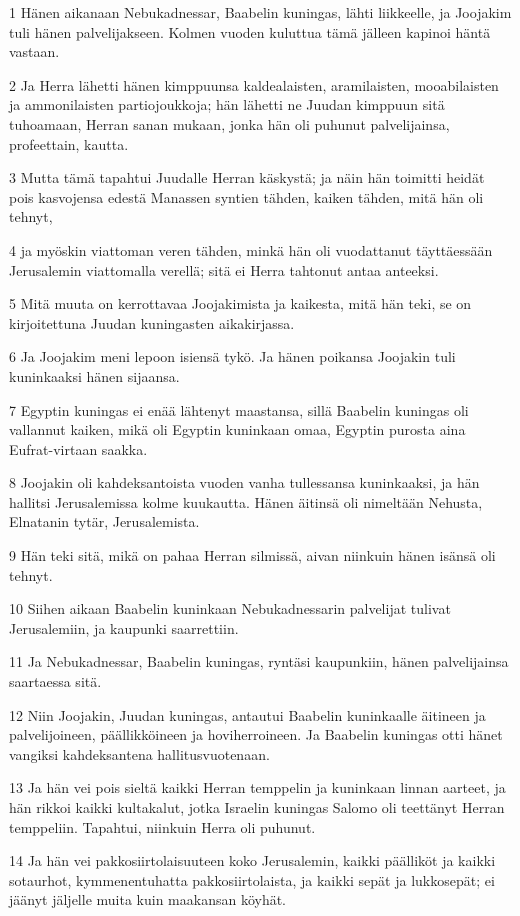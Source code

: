 \par 1 Hänen aikanaan Nebukadnessar, Baabelin kuningas, lähti liikkeelle, ja Joojakim tuli hänen palvelijakseen. Kolmen vuoden kuluttua tämä jälleen kapinoi häntä vastaan.
\par 2 Ja Herra lähetti hänen kimppuunsa kaldealaisten, aramilaisten, mooabilaisten ja ammonilaisten partiojoukkoja; hän lähetti ne Juudan kimppuun sitä tuhoamaan, Herran sanan mukaan, jonka hän oli puhunut palvelijainsa, profeettain, kautta.
\par 3 Mutta tämä tapahtui Juudalle Herran käskystä; ja näin hän toimitti heidät pois kasvojensa edestä Manassen syntien tähden, kaiken tähden, mitä hän oli tehnyt,
\par 4 ja myöskin viattoman veren tähden, minkä hän oli vuodattanut täyttäessään Jerusalemin viattomalla verellä; sitä ei Herra tahtonut antaa anteeksi.
\par 5 Mitä muuta on kerrottavaa Joojakimista ja kaikesta, mitä hän teki, se on kirjoitettuna Juudan kuningasten aikakirjassa.
\par 6 Ja Joojakim meni lepoon isiensä tykö. Ja hänen poikansa Joojakin tuli kuninkaaksi hänen sijaansa.
\par 7 Egyptin kuningas ei enää lähtenyt maastansa, sillä Baabelin kuningas oli vallannut kaiken, mikä oli Egyptin kuninkaan omaa, Egyptin purosta aina Eufrat-virtaan saakka.
\par 8 Joojakin oli kahdeksantoista vuoden vanha tullessansa kuninkaaksi, ja hän hallitsi Jerusalemissa kolme kuukautta. Hänen äitinsä oli nimeltään Nehusta, Elnatanin tytär, Jerusalemista.
\par 9 Hän teki sitä, mikä on pahaa Herran silmissä, aivan niinkuin hänen isänsä oli tehnyt.
\par 10 Siihen aikaan Baabelin kuninkaan Nebukadnessarin palvelijat tulivat Jerusalemiin, ja kaupunki saarrettiin.
\par 11 Ja Nebukadnessar, Baabelin kuningas, ryntäsi kaupunkiin, hänen palvelijainsa saartaessa sitä.
\par 12 Niin Joojakin, Juudan kuningas, antautui Baabelin kuninkaalle äitineen ja palvelijoineen, päällikköineen ja hoviherroineen. Ja Baabelin kuningas otti hänet vangiksi kahdeksantena hallitusvuotenaan.
\par 13 Ja hän vei pois sieltä kaikki Herran temppelin ja kuninkaan linnan aarteet, ja hän rikkoi kaikki kultakalut, jotka Israelin kuningas Salomo oli teettänyt Herran temppeliin. Tapahtui, niinkuin Herra oli puhunut.
\par 14 Ja hän vei pakkosiirtolaisuuteen koko Jerusalemin, kaikki päälliköt ja kaikki sotaurhot, kymmenentuhatta pakkosiirtolaista, ja kaikki sepät ja lukkosepät; ei jäänyt jäljelle muita kuin maakansan köyhät.
